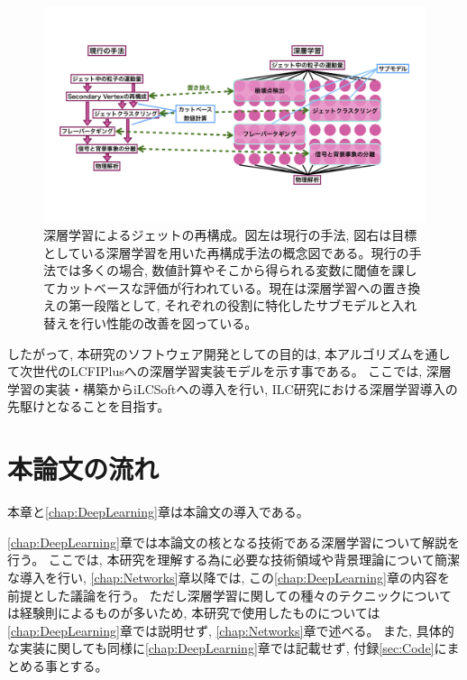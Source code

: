 \begin{figure}[htbp]
 \centering
 \includegraphics[trim = 0 100 0 50, width=1.0\textwidth, clip]{Figure/1Introduction/7JetReconstructionwithDeepLearning.png}
 \caption[深層学習によるジェットの再構成]{深層学習によるジェットの再構成。図左は現行の手法, 図右は目標としている深層学習を用いた再構成手法の概念図である。現行の手法では多くの場合, 数値計算やそこから得られる変数に閾値を課してカットベースな評価が行われている。現在は深層学習への置き換えの第一段階として, それぞれの役割に特化したサブモデルと入れ替えを行い性能の改善を図っている。}
 \label{7JetReconstructionwithDeepLearning}
\end{figure}

したがって, 本研究のソフトウェア開発としての目的は, 本アルゴリズムを通して次世代のLCFIPlusへの深層学習実装モデルを示す事である。
ここでは, 深層学習の実装・構築からiLCSoftへの導入を行い, ILC研究における深層学習導入の先駆けとなることを目指す。


\section{本論文の流れ} \label{Intro:Flow}

本章と\ref{chap:DeepLearning}章は本論文の導入である。

\ref{chap:DeepLearning}章では本論文の核となる技術である深層学習について解説を行う。
ここでは, 本研究を理解する為に必要な技術領域や背景理論について簡潔な導入を行い, \ref{chap:Networks}章以降では, この\ref{chap:DeepLearning}章の内容を前提とした議論を行う。
ただし深層学習に関しての種々のテクニックについては経験則によるものが多いため, 本研究で使用したものについては\ref{chap:DeepLearning}章では説明せず, \ref{chap:Networks}章で述べる。
また, 具体的な実装に関しても同様に\ref{chap:DeepLearning}章では記載せず, 付録\ref{sec:Code}にまとめる事とする。\\

